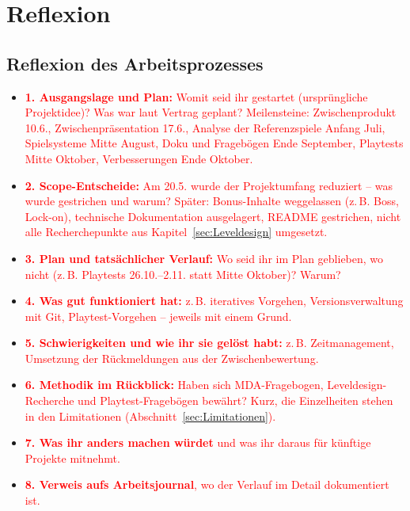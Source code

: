 \documentclass[../Main.tex]{subfiles}
\begin{document}
\section{Reflexion} \label{sec:Reflexion}

\subsection{Reflexion des Arbeitsprozesses}

\begin{itemize}[leftmargin=1.5cm]
    \item \textcolor{red}{\textbf{1. Ausgangslage und Plan:} Womit seid ihr gestartet (ursprüngliche Projektidee)? Was war laut Vertrag geplant? Meilensteine: Zwischenprodukt 10.6., Zwischenpräsentation 17.6., Analyse der Referenzspiele Anfang Juli, Spielsysteme Mitte August, Doku und Fragebögen Ende September, Playtests Mitte Oktober, Verbesserungen Ende Oktober.}
    \item \textcolor{red}{\textbf{2. Scope-Entscheide:} Am 20.5. wurde der Projektumfang reduziert -- was wurde gestrichen und warum? Später: Bonus-Inhalte weggelassen (z.\,B. Boss, Lock-on), technische Dokumentation ausgelagert, README gestrichen, nicht alle Recherchepunkte aus Kapitel~\ref{sec:Leveldesign} umgesetzt.}
    \item \textcolor{red}{\textbf{3. Plan und tatsächlicher Verlauf:} Wo seid ihr im Plan geblieben, wo nicht (z.\,B. Playtests 26.10.--2.11. statt Mitte Oktober)? Warum?}
    \item \textcolor{red}{\textbf{4. Was gut funktioniert hat:} z.\,B. iteratives Vorgehen, Versionsverwaltung mit Git, Playtest-Vorgehen -- jeweils mit einem Grund.}
    \item \textcolor{red}{\textbf{5. Schwierigkeiten und wie ihr sie gelöst habt:} z.\,B. Zeitmanagement, Umsetzung der Rückmeldungen aus der Zwischenbewertung.}
    \item \textcolor{red}{\textbf{6. Methodik im Rückblick:} Haben sich MDA-Fragebogen, Leveldesign-Recherche und Playtest-Fragebögen bewährt? Kurz, die Einzelheiten stehen in den Limitationen (Abschnitt~\ref{sec:Limitationen}).}
    \item \textcolor{red}{\textbf{7. Was ihr anders machen würdet} und was ihr daraus für künftige Projekte mitnehmt.}
    \item \textcolor{red}{\textbf{8. Verweis aufs Arbeitsjournal}, wo der Verlauf im Detail dokumentiert ist.}
\end{itemize}
\end{document}
